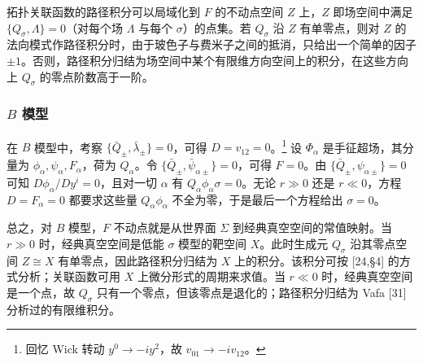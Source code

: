拓扑关联函数的路径积分可以局域化到 $F$ 的不动点空间 $Z$ 上，$Z$ 即场空间中满足 $\{Q_\sigma,\Lambda\}=0$（对每个场 $\Lambda$ 与每个 $\sigma$）的点集。若 $Q_\sigma$ 沿 $Z$ 有单零点，则对 $Z$ 的法向模式作路径积分时，由于玻色子与费米子之间的抵消，只给出一个简单的因子 $\pm1$。否则，路径积分归结为场空间中某个有限维方向空间上的积分，在这些方向上 $Q_\sigma$ 的零点阶数高于一阶。

\label{op:36}
\subsubsection*{$B$ 模型}

在 $B$ 模型中，考察 $\{\bar Q_\pm,\bar\lambda_\pm\}=0$，可得 $D=v_{12}=0$。\footnote{回忆 Wick 转动 $y^0\to-iy^2$，故 $v_{01}\to-iv_{12}$。} 设 $\Phi_\alpha$ 是手征超场，其分量为 $\phi_\alpha,\psi_\alpha,F_\alpha$，荷为 $Q_\alpha$。令 $\{\bar Q_\pm,\bar\psi_{\alpha\pm}\}=0$，可得 $F=0$。由 $\{\bar Q_\pm,\psi_{\alpha\pm}\}=0$ 可知 $D\phi_\alpha/Dy^i=0$，且对一切 $\alpha$ 有 $Q_\alpha\phi_\alpha\sigma=0$。无论 $r\gg0$ 还是 $r\ll0$，方程 $D=F_\alpha=0$ 都要求这些量 $Q_\alpha\phi_\alpha$ 不全为零，于是最后一个方程给出 $\sigma=0$。

总之，对 $B$ 模型，$F$ 不动点就是从世界面 $\Sigma$ 到经典真空空间的常值映射。当 $r\gg0$ 时，经典真空空间是低能 $\sigma$ 模型的靶空间 $X$。此时生成元 $Q_\sigma$ 沿其零点空间 $Z\cong X$ 有单零点，因此路径积分归结为 $X$ 上的积分。该积分可按 [24,§4] 的方式分析；关联函数可用 $X$ 上微分形式的周期来求值。当 $r\ll0$ 时，经典真空空间是一个点，故 $Q_\sigma$ 只有一个零点，但该零点是退化的；路径积分归结为 Vafa [31] 分析过的有限维积分。

